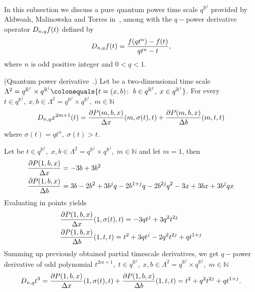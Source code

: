 In this subsection we discuss a pure quantum power time scale $q^{\mathbb{R}^j}$ provided by Aldwoah, Malinowska
and Torres in~\cite{aldwoah2011power}, among with the $q-$power derivative operator $D_{n,q} f(t)$ defined by
\begin{align*}
    D_{n,q} f(t) = \frac{f(qt^n) - f(t)}{qt^n - t},
\end{align*}
where $n$ is odd positive integer and $0 < q < 1$.
\begin{cor}
(Quantum power derivative~\cite{aldwoah2011power}.)
    Let be a two-dimensional time scale
    $\Lambda^2 = q^{\mathbb{R}^j} \times q^{\mathbb{R}^j}
    \colonequals \{t=(x,b) \colon \; b \in q^{\mathbb{R}^j}, \; x \in q^{\mathbb{R}^j} \}$.
    For every $t\in q^{\mathbb{R}^j}, \; x,b\in\Lambda^2 = q^{\mathbb{R}^j} \times q^{\mathbb{R}^j}, \; m\in\mathbb{N}$
    \[
        D_{n,q} x^{2m+1} (t)
        = \frac{\partial P ( m, b, x )}{\Delta x} (m, \sigma(t), t)
        + \frac{\partial P ( m, b, x )}{\Delta b} (m, t, t)
    \]
    where $\sigma(t) = qt^n, \; \sigma(t) > t$.
\end{cor}
\begin{examp}
    \label{time_scale_pure_quantum_power_example_1}
    Let be $t\in q^{\mathbb{R}^j}, \; x,b\in\Lambda^2 = q^{\mathbb{R}^j} \times q^{\mathbb{R}^j}, \; m\in\mathbb{N}$
    and let $m=1$, then
    \begin{align*}
        &\frac{\partial P ( 1, b, x )}{\Delta x} = -3 b + 3 b^2 \\
        &\frac{\partial P ( 1, b, x )}{\Delta b} = 3 b - 2 b^2 + 3 b^j q - 2 b^{1 + j} q - 2 b^{2 j} q^2 - 3 x + 3 b x + 3 b^j q x
    \end{align*}
    Evaluating in points yields
    \begin{align*}
        &\frac{\partial P ( 1, b, x )}{\Delta x}(1, \sigma(t), t) = -3 q t^j + 3 q^2 t^{2 j} \\
        &\frac{\partial P ( 1, b, x )}{\Delta b}(1, t, t) = t^2 + 3 q t^j - 2 q^2 t^{2 j} + q t^{1 + j}
    \end{align*}
    Summing up previously obtained partial timescale derivatives, we get $q-$power derivative of odd polynomial
    $t^{2m+1}, \; t\in q^{\mathbb{R}^j}, \; x,b\in\Lambda^2 = q^{\mathbb{R}^j} \times q^{\mathbb{R}^j}, \; m\in\mathbb{N}$
    \begin{align*}
        D_{n,q} t^{3}
        = \frac{\partial P ( 1, b, x )}{\Delta x} (1, \sigma(t), t)
        + \frac{\partial P ( 1, b, x )}{\Delta b} (1, t, t)
        = t^2 + q^2 t^{2 j} + q t^{1 + j}.
    \end{align*}
\end{examp}

